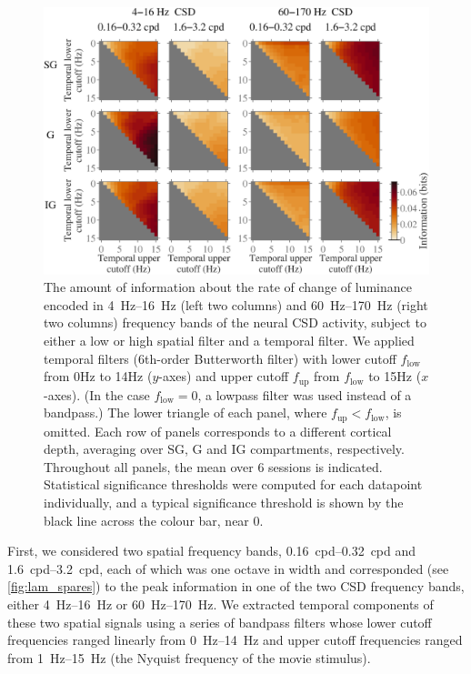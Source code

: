 \begin{figure}[htbp]
\centering
\includegraphics[scale=.5]{figs/tmf/tmf-v-tmf-sggig-avg-tmfres1b-2Band-2Crs.eps}
%
\caption{
The amount of information about the rate of change of luminance encoded in \SIrange{4}{16}{Hz} (left two columns) and \SIrange{60}{170}{Hz} (right two columns) frequency bands of the neural \ac{CSD} activity, subject to either a low or high spatial filter and a temporal filter.
We applied temporal filters (6th-order Butterworth filter) with lower cutoff $f_\text{low}$ from \num{0}{Hz} to \num{14}{Hz} ($y$-axes) and upper cutoff $f_\text{up}$ from $f_\text{low}$ to \num{15}{Hz} ($x$-axes).
(In the case $f_\text{low} = 0$, a lowpass filter was used instead of a bandpass.)
The lower triangle of each panel, where $f_\text{up} < f_\text{low}$, is omitted.
Each row of panels corresponds to a different cortical depth, averaging over \ac{SG}, \ac{G} and \ac{IG} compartments, respectively.
Throughout all panels, the mean over \num{6} sessions is indicated.
Statistical significance thresholds were computed for each datapoint individually, and a typical significance threshold is shown by the black line across the colour bar, near $0$.
}
\label{fig:lam_tmf}
%
\end{figure}

First, we considered two spatial frequency bands, \SIrange{0.16}{0.32}{cpd} and \SIrange{1.6}{3.2}{cpd}, each of which was one octave in width and corresponded (see \autoref{fig:lam_spares}) to the peak information in one of the two \ac{CSD} frequency bands, either \SIrange{4}{16}{Hz} or \SIrange{60}{170}{Hz}.
We extracted temporal components of these two spatial signals using a series of bandpass filters whose lower cutoff frequencies ranged linearly from \SIrange{0}{14}{Hz} and upper cutoff frequencies ranged from \SIrange{1}{15}{Hz} (the Nyquist frequency of the movie stimulus).


